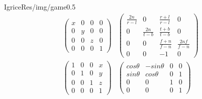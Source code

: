\documentclass{beamer}
\begin{document}
    \begin{framebg}{Igrice}{Res/img/game}{0.5}
        \begin{align*}
            \begin{pmatrix}
                x & 0 & 0 & 0 \\
                0 & y & 0 & 0 \\
                0 & 0 & z & 0 \\
                0 & 0 & 0 & 1
            \end{pmatrix} &
            \begin{pmatrix}
                \frac{2n}{r-l} & 0 & \frac{r+l}{r-l} & 0 \\
                0 & \frac{2n}{t-b} & \frac{t+b}{t-b} & 0 \\
                0 & 0 & \frac{f+n}{f-n} & \frac{2nf}{f-n} \\
                0 & 0 & -1 & 0
            \end{pmatrix} \\
            \begin{pmatrix}
                1 & 0 & 0 & x \\
                0 & 1 & 0 & y \\
                0 & 0 & 1 & z \\
                0 & 0 & 0 & 1
            \end{pmatrix} &
            \begin{pmatrix}
                cos \theta & -sin \theta & 0 & 0 \\
                sin \theta &  cos \theta & 0 & 1 \\
                0 & 0 & 1 & 0 \\
                0 & 0 & 0 & 1
            \end{pmatrix}
        \end{align*}
    \end{framebg}
\end{document}
